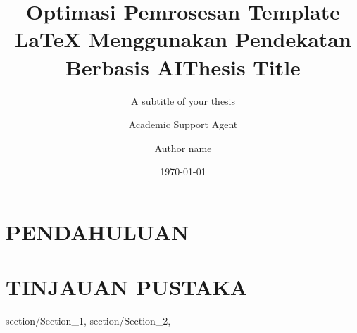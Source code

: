 \documentclass{ifimaster}
\title{Optimasi Pemrosesan Template LaTeX Menggunakan Pendekatan Berbasis AI}
\author{Academic Support Agent}
\date{\today}
\begin{document}
\maketitle

\begin{abstract}

\end{abstract}

\chapter{PENDAHULUAN}


\chapter{TINJAUAN PUSTAKA}


\usepackage[utf8]{inputenc}           %
\usepackage[T1]{fontenc,url}
\usepackage{babel,textcomp,csquotes,duomasterforside,varioref,graphicx}
\usepackage[backend=biber,style=numeric-comp]{biblatex}
\usepackage{amsmath,amssymb,amsfonts}
\usepackage{algorithmic}
\usepackage{textcomp}
\usepackage{xcolor}
\usepackage{textgreek}
\usepackage{float}
\usepackage{graphicx}

\raggedbottom %

\title{Thesis Title}        %
\subtitle{A subtitle of your thesis }         %
\author{Author name}                      %




{
    section/Section_1,
    section/Section_2,
}
\end{document}
